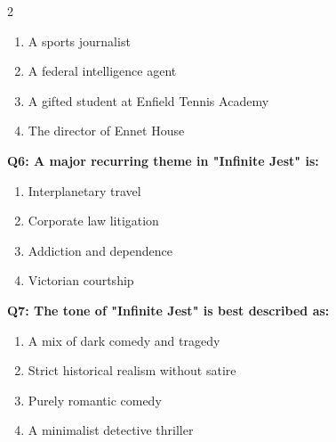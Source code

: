 \documentclass[10pt]{article}
\begin{document}
\begin{multicols}{2}
\begin{enumerate}[label=\arabic*.]
\item A sports journalist
\item A federal intelligence agent
\item A gifted student at Enfield Tennis Academy
\item The director of Ennet House
\end{enumerate}
\textbf{Q6: A major recurring theme in "Infinite Jest" is:}

\begin{enumerate}[label=\arabic*.]
\item Interplanetary travel
\item Corporate law litigation
\item Addiction and dependence
\item Victorian courtship
\end{enumerate}
\textbf{Q7: The tone of "Infinite Jest" is best described as:}

\begin{enumerate}[label=\arabic*.]
\item A mix of dark comedy and tragedy
\item Strict historical realism without satire
\item Purely romantic comedy
\item A minimalist detective thriller
\end{enumerate}
\end{multicols}

\newpage
\end{document}
